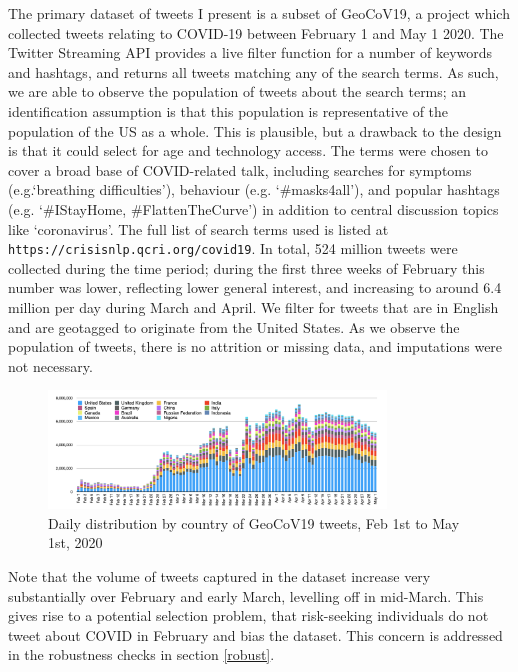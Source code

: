 \documentclass[12pt,a4]{article}
\begin{document}
The primary dataset of tweets I present is a subset of GeoCoV19, a project which collected tweets relating to COVID-19 between February 1 and May 1 2020. The Twitter Streaming API provides a live filter function for a number of keywords and hashtags, and returns all tweets matching any of the search terms. As such, we are able to observe the population of tweets about the search terms; an identification assumption is that this population is representative of the population of the US as a whole. This is plausible, but a drawback to the design is that it could select for age and technology access. The terms were chosen to cover a broad base of COVID-related talk, including searches for symptoms (e.g.`breathing difficulties'), behaviour (e.g. `\#masks4all'), and popular hashtags (e.g. `\#IStayHome, \#FlattenTheCurve') in addition to central discussion topics like `coronavirus'. The full list of search terms used is listed at \texttt{https://crisisnlp.qcri.org/covid19}. In total, 524 million tweets were collected during the time period; during the first three weeks of February this number was lower, reflecting lower general interest, and increasing to around 6.4 million per day during March and April. We filter for tweets that are in English and are geotagged to originate from the United States. As we observe the population of tweets, there is no attrition or missing data, and imputations were not necessary.
\begin{figure}[h!]
    \includegraphics[width=0.8\textwidth]{figs/GeoCov-countrydistribution.png}    
    \centering
    \caption{Daily distribution by country of GeoCoV19 tweets, Feb 1st to May 1st, 2020 \parencite{qaziGeoCoV19DatasetHundreds2020a}}
\end{figure}
Note that the volume of tweets captured in the dataset increase very substantially over February and early March, levelling off in mid-March. This gives rise to a potential selection problem, that risk-seeking individuals do not tweet about COVID in February and bias the dataset. This concern is addressed in the robustness checks in section \ref{robust}.
\end{document}
